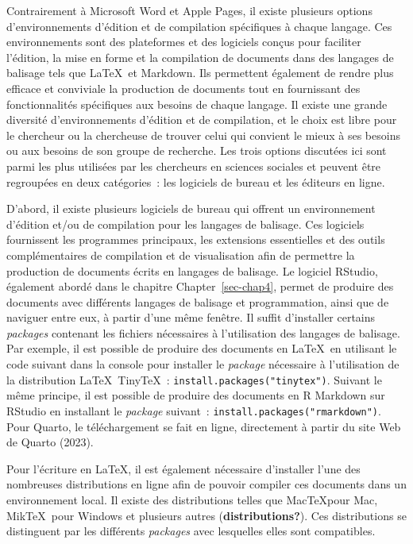 \documentclass[
  letterpaper,
]{scrbook}
\begin{document}
Contrairement à Microsoft Word et Apple Pages, il existe plusieurs
options d'environnements d'édition et de compilation spécifiques à
chaque langage. Ces environnements sont des plateformes et des logiciels
conçus pour faciliter l'édition, la mise en forme et la compilation de
documents dans des langages de balisage tels que \LaTeX~et Markdown. Ils
permettent également de rendre plus efficace et conviviale la production
de documents tout en fournissant des fonctionnalités spécifiques aux
besoins de chaque langage. Il existe une grande diversité
d'environnements d'édition et de compilation, et le choix est libre pour
le chercheur ou la chercheuse de trouver celui qui convient le mieux à
ses besoins ou aux besoins de son groupe de recherche. Les trois options
discutées ici sont parmi les plus utilisées par les chercheurs en
sciences sociales et peuvent être regroupées en deux catégories~: les
logiciels de bureau et les éditeurs en ligne.

D'abord, il existe plusieurs logiciels de bureau qui offrent un
environnement d'édition et/ou de compilation pour les langages de
balisage. Ces logiciels fournissent les programmes principaux, les
extensions essentielles et des outils complémentaires de compilation et
de visualisation afin de permettre la production de documents écrits en
langages de balisage. Le logiciel RStudio, également abordé dans le
chapitre Chapter~\ref{sec-chap4}, permet de produire des documents avec
différents langages de balisage et programmation, ainsi que de naviguer
entre eux, à partir d'une même fenêtre. Il suffit d'installer certains
\emph{packages} contenant les fichiers nécessaires à l'utilisation des
langages de balisage. Par exemple, il est possible de produire des
documents en \LaTeX~en utilisant le code suivant dans la console pour
installer le \emph{package} nécessaire à l'utilisation de la
distribution \LaTeX~Tiny\TeX~: \texttt{install.packages("tinytex")}.
Suivant le même principe, il est possible de produire des documents en R
Markdown sur RStudio en installant le \emph{package} suivant~:
\texttt{install.packages("rmarkdown")}. Pour Quarto, le téléchargement
se fait en ligne, directement à partir du site Web de Quarto (2023).

Pour l'écriture en \LaTeX, il est également nécessaire d'installer l'une
des nombreuses distributions en ligne afin de pouvoir compiler ces
documents dans un environnement local. Il existe des distributions
telles que Mac\TeX pour Mac, Mik\TeX~pour Windows et plusieurs autres
(\textbf{distributions?}). Ces distributions se distinguent par les
différents \emph{packages} avec lesquelles elles sont compatibles.
\end{document}
